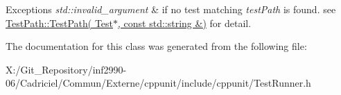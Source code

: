 \begin{DoxyExceptions}{Exceptions}
{\em std\-::invalid\-\_\-argument} & if no test matching {\itshape test\-Path} is found. see \hyperlink{class_test_path_a5855701e39a328a19f9780a130106cb3}{Test\-Path\-::\-Test\-Path( Test$\ast$, const std\-::string \&)} for detail. \\
\hline
\end{DoxyExceptions}


The documentation for this class was generated from the following file\-:\begin{DoxyCompactItemize}
\item 
X\-:/\-Git\-\_\-\-Repository/inf2990-\/06/\-Cadriciel/\-Commun/\-Externe/cppunit/include/cppunit/Test\-Runner.\-h\end{DoxyCompactItemize}
